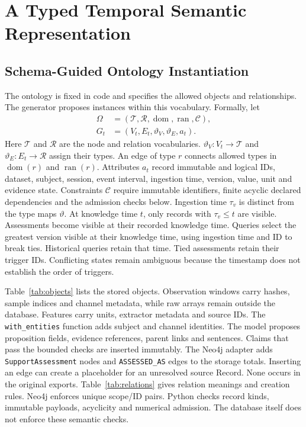 \section{A Typed Temporal Semantic Representation}
\label{sec:representation}

\subsection{Schema-Guided Ontology Instantiation}

The ontology is fixed in code and specifies the allowed objects and relationships.
The generator proposes instances within this vocabulary. Formally, let
\begin{equation}
\begin{split}
 \Omega&=(\mathcal T,\mathcal R,\operatorname{dom},\operatorname{ran},\mathcal C),\\
 G_t&=(V_t,E_t,\vartheta_V,\vartheta_E,a_t).
\end{split}
\label{eq:ontology}
\end{equation}
Here $\mathcal T$ and $\mathcal R$ are the node and relation vocabularies.
$\vartheta_V:V_t\to\mathcal T$ and $\vartheta_E:E_t\to\mathcal R$
assign their types. An edge of type $r$ connects allowed types in
$\operatorname{dom}(r)$ and $\operatorname{ran}(r)$. Attributes $a_t$ record
immutable and logical IDs, dataset, subject, session, event interval, ingestion
time, version, value, unit and evidence state. Constraints $\mathcal C$ require
immutable identifiers, finite acyclic declared dependencies and the admission
checks below. Ingestion time $\tau_v$ is distinct from the type maps $\vartheta$.
At knowledge time $t$, only records with $\tau_v\leq t$ are visible.
Assessments become visible at their recorded knowledge time.
Queries select the greatest version visible at their knowledge time,
using ingestion time and ID to break ties. Historical queries retain that time. Tied assessments retain their trigger IDs. Conflicting states
remain ambiguous because the timestamp does not establish the order of triggers.

Table~\ref{tab:objects} lists the stored objects. Observation windows carry hashes,
sample indices and channel metadata, while raw arrays remain outside the database.
Features carry units, extractor metadata and source IDs. The
\texttt{with\_entities} function adds subject and channel identities.
The model proposes proposition fields, evidence references, parent links and
sentences. Claims that pass the bounded checks are inserted immutably.
The Neo4j adapter adds \texttt{SupportAssessment} nodes and
\texttt{ASSESSED\_AS} edges to the storage totals.
Inserting an edge can create a placeholder for an unresolved source Record.
None occurs in the original exports. Table~\ref{tab:relations} gives relation
meanings and creation rules. Neo4j enforces unique scope/ID pairs.
Python checks record kinds, immutable payloads, acyclicity and numerical
admission. The database itself does not enforce these semantic checks.

